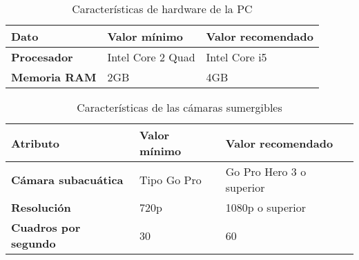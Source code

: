 \begin{longtable}{ | p{4.5cm} | p{4.5cm} | p{4.5cm} | }
	\caption{Características de hardware de la PC}
	\label{table:hardwarepc}
	\\	\hline
		 \textbf{Dato} &\textbf{Valor mínimo}&\textbf{Valor recomendado}
		\\ \hline
        \textbf{Procesador}&Intel Core 2 Quad& Intel Core i5
        \\ \hline
        \textbf{Memoria RAM }&2GB&4GB
        \\ \hline
\end{longtable}

\begin{longtable}{ | p{4.25cm} | p{4.25cm} |  p{5.0cm}  | }
	\caption{Características de las cámaras sumergibles}
	\label{table:camaras}
	\\	\hline
		 \textbf{Atributo} &\textbf{Valor mínimo}&\textbf{Valor recomendado}
		\\ \hline
        \textbf{Cámara subacuática}&Tipo Go Pro&Go Pro Hero 3 o superior
		\\ \hline
		\textbf{Resolución}&720p&1080p o superior
		\\ \hline
		\textbf{Cuadros por segundo}&30&60
		\\ \hline
\end{longtable}
